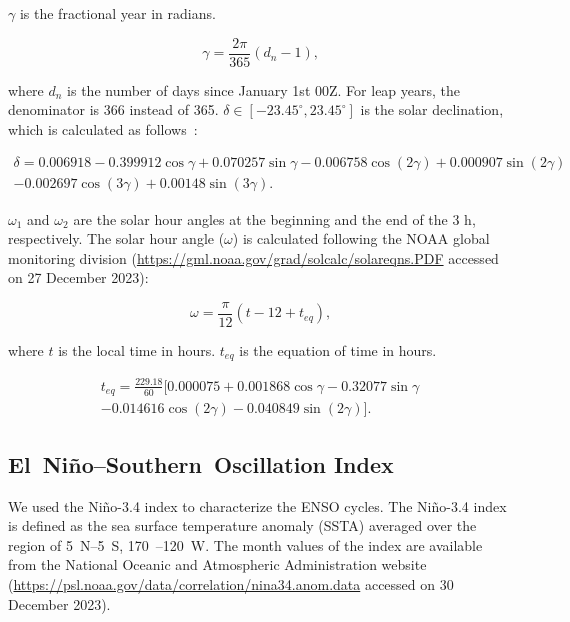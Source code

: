 \documentclass[atmosphere,article,accept,pdftex,moreauthors]{Definitions/mdpi}
\begin{document}
\(\gamma\) is the fractional year in radians.
\begin{linenomath}
  \begin{equation}\label{eq:fractionalyear}
    \gamma = \frac{2\pi}{365}(d_n - 1) \text{,}
  \end{equation}
\end{linenomath}
where \(d_n\) is the number of days since January 1st 00Z. For leap years, the denominator is 366 instead of 365. \(\delta \in [-23.45^\circ, 23.45^\circ]\) is the solar declination, which is calculated as follows~\cite{udo2000SE}:
\begin{linenomath}
  \begin{multline}\label{eq:declination}
    \delta = 0.006918
    - 0.399912\cos\gamma
    + 0.070257\sin\gamma
    - 0.006758\cos(2\gamma)
    + 0.000907\sin(2\gamma) \\
    - 0.002697\cos(3\gamma)
    + 0.00148\sin(3\gamma) \text{.}
  \end{multline}
\end{linenomath}
\(\omega_1\) and \(\omega_2\) are the solar hour angles at the beginning and the end of the 3 h, respectively. The solar hour angle (\(\omega\)) is calculated following the NOAA global monitoring division (\url{https://gml.noaa.gov/grad/solcalc/solareqns.PDF} accessed on 27 December 2023):
\begin{linenomath}
  \begin{equation}\label{eq:hourangle}
    \omega = \frac{\pi}{12}\left(t - 12 + t_{eq}\right)\text{,}
  \end{equation}
\end{linenomath}
where \(t\) is the local time in hours. \(t_{eq}\) is the equation of time in hours.
\begin{linenomath}
  \begin{multline}\label{eq:equationoftime}
    t_{eq} = \frac{229.18}{60}[0.000075
      + 0.001868\cos\gamma
      - 0.32077\sin\gamma \\
      - 0.014616\cos(2\gamma)
      - 0.040849\sin(2\gamma)] \text{.}
  \end{multline}
\end{linenomath}

\subsection{El~Niño--Southern~Oscillation Index}\label{sec:enso}

We used the Niño-3.4 index to characterize the ENSO cycles. The Niño-3.4 index is defined as the sea surface temperature anomaly (SSTA) averaged over the region of 5~\textdegree{}N--5~\textdegree{}S, 170~\textdegree{}--120~\textdegree{}W. The month values of the index are available from the National Oceanic and Atmospheric Administration website (\url{https://psl.noaa.gov/data/correlation/nina34.anom.data} accessed on 30 December 2023).
\end{document}
